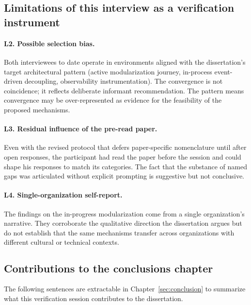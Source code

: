 \subsection*{Limitations of this interview as a verification instrument}

\paragraph*{L2. Possible selection bias.} Both interviewees to date operate in environments aligned with the dissertation's target architectural pattern (active modularization journey, in-process event-driven decoupling, observability instrumentation). The convergence is not coincidence; it reflects deliberate informant recommendation. The pattern means convergence may be over-represented as evidence for the feasibility of the proposed mechanisms.

\paragraph*{L3. Residual influence of the pre-read paper.} Even with the revised protocol that defers paper-specific nomenclature until after open responses, the participant had read the paper before the session and could shape his responses to match its categories. The fact that the substance of named gaps was articulated without explicit prompting is suggestive but not conclusive.

\paragraph*{L4. Single-organization self-report.} The findings on the in-progress modularization come from a single organization's narrative. They corroborate the qualitative direction the dissertation argues but do not establish that the same mechanisms transfer across organizations with different cultural or technical contexts.

\subsection*{Contributions to the conclusions chapter}

The following sentences are extractable in Chapter~\ref{sec:conclusion} to summarize what this verification session contributes to the dissertation.


